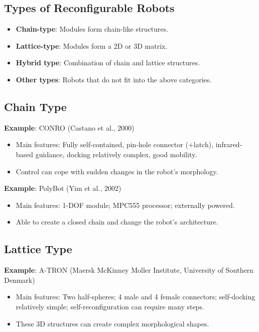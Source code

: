 \subsection*{Types of Reconfigurable Robots}
\begin{itemize}
    \item \textbf{Chain-type}: Modules form chain-like structures.
    \item \textbf{Lattice-type}: Modules form a 2D or 3D matrix.
    \item \textbf{Hybrid type}: Combination of chain and lattice structures.
    \item \textbf{Other types}: Robots that do not fit into the above categories.
\end{itemize}

\subsection*{Chain Type}
\textbf{Example}: CONRO (Castano et al., 2000)
\begin{itemize}
    \item Main features: Fully self-contained, pin-hole connector (+latch), infrared-based guidance, docking relatively complex, good mobility.
    \item Control can cope with sudden changes in the robot’s morphology.
\end{itemize}
\textbf{Example}: PolyBot (Yim et al., 2002)
\begin{itemize}
   \item Main features: 1-DOF module; MPC555 processor; externally powered.
   \item Able to create a closed chain and change the robot's architecture.
\end{itemize}

\subsection*{Lattice Type}
\textbf{Example}: A-TRON (Maersk McKinney Moller Institute, University of Southern Denmark)
\begin{itemize}
   \item Main features: Two half-spheres; 4 male and 4 female connectors; self-docking relatively simple; self-reconfiguration can require many steps.
    \item These 3D structures can create complex morphological shapes.
\end{itemize}

